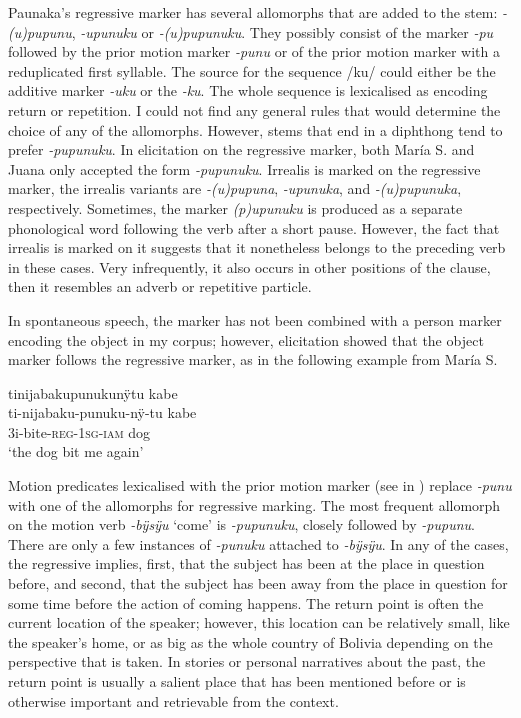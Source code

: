 Paunaka’s regressive marker has several allomorphs that are added to the stem: \textit{-(u)pupunu}, \textit{-upunuku} or \textit{-(u)pupunuku}. They possibly consist of the  marker \textit{-pu} followed by the prior motion marker \textit{-punu} or of the prior motion marker with a reduplicated first syllable. The source for the sequence /ku/ could either be the additive marker \textit{-uku} or the  \textit{-ku}. The whole sequence is lexicalised as encoding return or repetition. I could not find any general rules that would determine the choice of any of the allomorphs. However, stems that end in a diphthong tend to prefer \textit{-pupunuku}. In elicitation on the regressive marker, both María S. and Juana only accepted the form \textit{-pupunuku}. %
Irrealis is marked on the regressive marker, the irrealis variants are \textit{-(u)pupuna}, \textit{-upunuka}, and \textit{-(u)pupunuka}, respectively. Sometimes, the marker \textit{(p)upunuku} is produced as a separate phonological word following the verb after a short pause. However, the fact that irrealis is marked on it suggests that it nonetheless belongs to the preceding verb in these cases. Very infrequently, it also occurs in other positions of the clause, then it resembles an adverb or repetitive particle.

In spontaneous speech, the marker has not been combined with a person marker encoding the object in my corpus; however, elicitation showed that the object marker follows the regressive marker, as in the following example from María S.

\ea\label{ex:dog-bite-again}
\begingl
\glpreamble tinijabakupunukunÿtu kabe\\
\gla ti-nijabaku-punuku-nÿ-tu kabe\\
\glb 3i-bite-\textsc{reg}-1\textsc{sg}-\textsc{iam} dog\\
\glft ‘the dog bit me again’
\endgl
\trailingcitation{[rxx-e181018le-a]}
\xe

Motion predicates lexicalised with the prior motion marker (see  in ) replace  \textit{-punu} with one of the allomorphs for regressive marking. %
The most frequent allomorph on the motion verb \textit{-bÿsÿu} ‘come’ is \textit{-pupunuku}, closely followed by \textit{-pupunu}. There are only a few instances of \textit{-punuku} attached to \textit{-bÿsÿu}.
In any of the cases, the regressive implies, first, that the subject has been at the place in question before, and second, that the subject has been away from the place in question for some time before the action of coming happens. The return point is often the current location of the speaker; however, this location can be relatively small, like the speaker’s home, or as big as the whole country of Bolivia depending on the perspective that is taken. In stories or personal narratives about the past, the return point is usually a salient place that has been mentioned before or is otherwise important and retrievable from the context.


